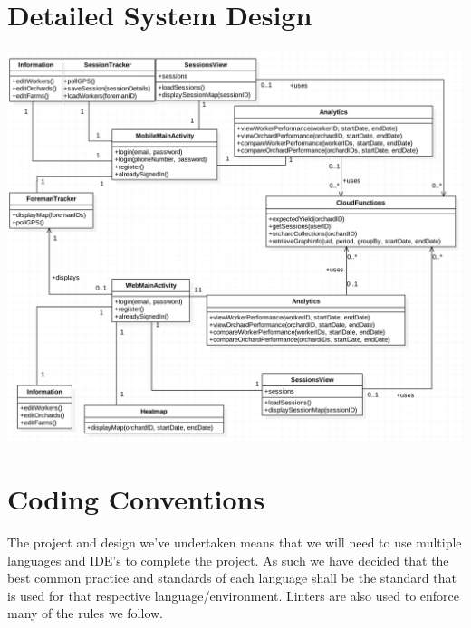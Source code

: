 \documentclass[12pt]{article}
\begin{document}
\section{Detailed System Design}
\includegraphics[width=1.2\linewidth]{UMLClassDiag.png}
\newpage

\section{Coding Conventions}
  \flushleft
  The project and design we've undertaken means that we will need to use multiple languages and IDE's to complete the project. As such we have decided that the best common practice and standards of each language shall be the standard that is used for that respective language/environment. Linters are also used to enforce many of the rules we follow.
\end{document}
